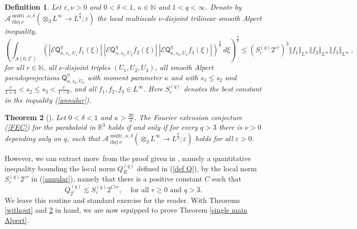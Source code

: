 \documentclass{amsart}%
\newtheorem{theorem}{Theorem}
\theoremstyle{plain}
\newtheorem{definition}[theorem]{Definition}
\numberwithin{equation}{section}
\begin{document}
\begin{definition}
Let $\varepsilon,\nu>0$ and $0<\delta<1$, $\kappa\in\mathbb{N}$ and
$1<q<\infty$. Denote by $\mathcal{A}_{\operatorname*{disj}\nu}%
^{\operatorname*{multi},\kappa,\delta}\left(  \otimes_{3}L^{\infty}\rightarrow
L^{\frac{q}{3}};\varepsilon\right)  $ the \emph{local multiscale} $\nu
$-disjoint trilinear smooth Alpert inequality,%
\begin{equation}
\left(  \int_{A\left(  0,2^{r}\right)  }\left(  \left\vert \mathcal{E}%
\mathsf{Q}_{\kappa,s_{1},U_{1}}^{\eta}f_{1}\left(  \xi\right)  \right\vert
\ \left\vert \mathcal{E}\mathsf{Q}_{\kappa,s_{2},U_{2}}^{\eta}f_{2}\left(
\xi\right)  \right\vert \ \left\vert \mathcal{E}\mathsf{Q}_{\kappa,s_{3}%
,U_{3}}^{\eta}f_{3}\left(  \xi\right)  \right\vert \right)  ^{\frac{q}{3}%
}\ d\xi\right)  ^{\frac{3}{q}}\leq\left(  S_{\varepsilon}^{\left(  q\right)
}2^{\varepsilon r}\right)  ^{3}\left\Vert f_{1}\right\Vert _{L^{\infty}%
}\left\Vert f_{2}\right\Vert _{L^{\infty}}\left\Vert f_{3}\right\Vert
_{L^{\infty}}\ ,\label{annular}%
\end{equation}
for all $r\in\mathbb{N}$, all $\nu$\emph{-disjoint} triples $\left(
U_{1},U_{2},U_{3}\right)  $, all smooth Alpert pseudoprojections
$\mathsf{Q}_{\kappa,s_{k},U_{k}}^{\eta}$ with moment parameter $\kappa$ and
with $s_{1}\leq s_{2}$ and $\frac{r}{1+\delta}<s_{2}\leq s_{3}<\frac
{r}{1-\delta} $, and all $f_{1},f_{2},f_{3}\in L^{\infty}$. Here
$S_{\varepsilon}^{\left(  q\right)  }$ denotes the best constant in the
inquality (\ref{annular}).
\end{definition}

\begin{theorem}
[\cite{RiSa}]\label{main Alpert}Let $0<\delta<1$ and $\kappa>\frac{20}{\delta
}$. The Fourier extension conjecture (\ref{FEC}) for the paraboloid in
$\mathbb{R}^{3}$ holds \emph{if and only if} for every $q>3$ there is $\nu>0$
depending only on $q$, such that $\mathcal{A}_{\operatorname*{disj}\nu
}^{\operatorname*{multi},\kappa,\delta}\left(  \otimes_{3}L^{\infty
}\rightarrow L^{\frac{q}{3}};\varepsilon\right)  $ holds for all
$\varepsilon>0$.
\end{theorem}

However, we can extract more\ from the proof given in \cite{RiSa}, namely a
quantitative inequality bounding the local norm $Q_{R}^{\left(  q\right)  }$
defined in (\ref{def Q}), by the local norm $S_{\varepsilon}^{\left(
q\right)  }2^{\varepsilon r}$ in (\ref{annular}), namely that there is a
positive constant $C$ such that%
\begin{equation}
Q_{2^{r}}^{\left(  q\right)  }\lesssim S_{\varepsilon}^{\left(  q\right)
}2^{C\varepsilon r},\ \ \ \ \ \text{for all }r\geq0\text{ and }%
q>3.\label{Q=<S}%
\end{equation}
We leave this routine and standard exercise for the reader. With Theorems
\ref{without} and \ref{main Alpert} in hand, we are now equipped to prove
Theorem \ref{single main Alpert}.
\end{document}
